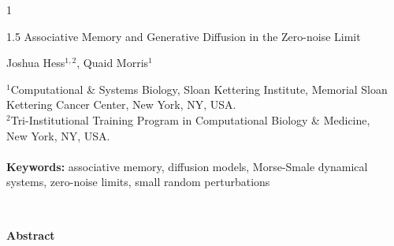 \documentclass[12pt]{article}
\begin{document}
\hspace{13.9cm}1

\begin{center}
\vspace{20mm}

\begin{spacing}{1.5}
    {\Large Associative Memory and Generative Diffusion in the Zero-noise Limit} \\[4mm]
\end{spacing}

{\large  Joshua Hess$^{1,2}$, Quaid Morris$^{1}$} \\[2mm]
\end{center}
$^1$Computational \& Systems Biology, 
       Sloan Kettering Institute, Memorial Sloan Kettering Cancer Center, New York, NY, USA. \\
$^2$Tri-Institutional Training Program in Computational Biology \& Medicine, \\
       New York, NY, USA. \\
\ \\[-2mm]
\noindent
{\bf Keywords:} associative memory, diffusion models, Morse-Smale dynamical systems, zero-noise limits, small random perturbations


\thispagestyle{empty}
%
\ \vspace{-0mm}\\
%
\begin{center} {\bf Abstract} \end{center}
\end{document}
